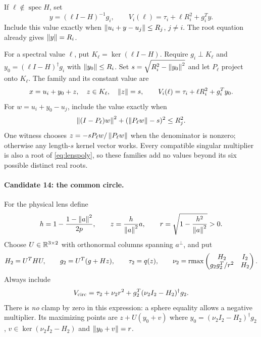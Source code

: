 If $\ell\notin\operatorname{spec}H$, set
\[
 y=(\ell I-H)^{-1}g_i,\qquad
 V_i(\ell)=\tau_i+\ell R_i^2+g_i^Ty.
\]
Include this value exactly when $\left\lVert u_i+y-u_j\right\rVert\leq R_j$, $j\ne i$.
The root equation already gives $\left\lVert y\right\rVert=R_i$.

For a spectral value $\ell$, put $K_\ell=\ker(\ell I-H)$.
Require $g_i\perp K_\ell$ and
$y_0=(\ell I-H)^\dagger g_i$ with $\left\lVert y_0\right\rVert\leq R_i$.
Set $s=\sqrt{R_i^2-\left\lVert y_0\right\rVert^2}$ and let $P_\ell$ project onto $K_\ell$.
The family and its constant value are
\[
 x=u_i+y_0+z,\quad z\in K_\ell,\quad\left\lVert z\right\rVert=s,
 \qquad V_i(\ell)=\tau_i+\ell R_i^2+g_i^Ty_0.
\]
For $w=u_i+y_0-u_j$, include the value exactly when
\begin{equation}\label{eq:spherefeasible}
 \left\lVert(I-P_\ell)w\right\rVert^2+(\left\lVert P_\ell w\right\rVert-s)^2\leq R_j^2.
\end{equation}
One witness chooses $z=-sP_\ell w/\left\lVert P_\ell w\right\rVert$ when the denominator
is nonzero; otherwise any length-$s$ kernel vector works. Every compatible
singular multiplier is also a root of \eqref{eq:lenspoly}, so these
families add no values beyond its six possible distinct real roots.

\paragraph{Candidate 14: the common circle.}
For the physical lens define
\[
 h=1-\frac{1-\left\lVert a\right\rVert^2}{2p},\qquad
 z=\frac{h}{\left\lVert a\right\rVert^2}a,\qquad
 r=\sqrt{1-\frac{h^2}{\left\lVert a\right\rVert^2}}>0.
\]
Choose $U\in\mathbb R^{3\times2}$ with orthonormal columns spanning $a^\perp$,
and put
\[
 H_2=U^THU,\qquad g_2=U^T(g+Hz),\qquad\tau_2=q(z),
 \qquad\nu_2=\operatorname{rmax}\begin{pmatrix}H_2&I_2\\g_2g_2^T/r^2&H_2\end{pmatrix}.
\]
Always include
\begin{equation}\label{eq:circlevalue}
 V_{\rm circ}=\tau_2+\nu_2r^2+g_2^T(\nu_2I_2-H_2)^\dagger g_2.
\end{equation}
There is \emph{no} clamp by zero in this expression: a sphere equality
allows a negative multiplier. Its maximizing points are
$z+U(y_0+v)$ where $y_0=(\nu_2I_2-H_2)^\dagger g_2$,
$v\in\ker(\nu_2I_2-H_2)$ and $\left\lVert y_0+v\right\rVert=r$.

